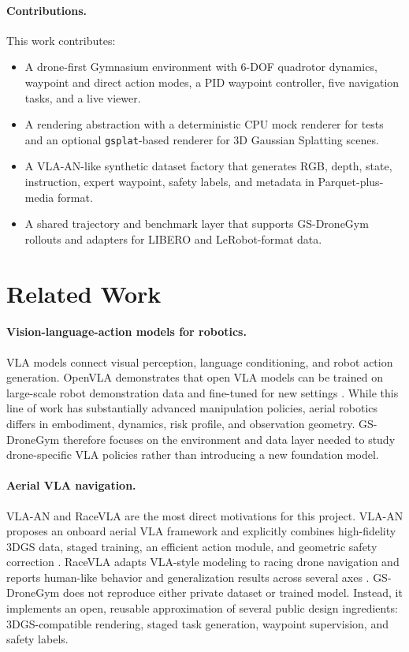 \documentclass[11pt]{article}
\begin{document}
\paragraph{Contributions.}
This work contributes:
\begin{itemize}[leftmargin=*]
    \item A drone-first Gymnasium environment with 6-DOF quadrotor dynamics, waypoint and direct action modes, a PID waypoint controller, five navigation tasks, and a live viewer.
    \item A rendering abstraction with a deterministic CPU mock renderer for tests and an optional \texttt{gsplat}-based renderer for 3D Gaussian Splatting scenes.
    \item A VLA-AN-like synthetic dataset factory that generates RGB, depth, state, instruction, expert waypoint, safety labels, and metadata in Parquet-plus-media format.
    \item A shared trajectory and benchmark layer that supports GS-DroneGym rollouts and adapters for LIBERO and LeRobot-format data.
\end{itemize}

\section{Related Work}

\paragraph{Vision-language-action models for robotics.}
VLA models connect visual perception, language conditioning, and robot action generation. OpenVLA demonstrates that open VLA models can be trained on large-scale robot demonstration data and fine-tuned for new settings \cite{kim2024openvla}. While this line of work has substantially advanced manipulation policies, aerial robotics differs in embodiment, dynamics, risk profile, and observation geometry. GS-DroneGym therefore focuses on the environment and data layer needed to study drone-specific VLA policies rather than introducing a new foundation model.

\paragraph{Aerial VLA navigation.}
VLA-AN and RaceVLA are the most direct motivations for this project. VLA-AN proposes an onboard aerial VLA framework and explicitly combines high-fidelity 3DGS data, staged training, an efficient action module, and geometric safety correction \cite{wu2025vlaan}. RaceVLA adapts VLA-style modeling to racing drone navigation and reports human-like behavior and generalization results across several axes \cite{serpiva2025racevla}. GS-DroneGym does not reproduce either private dataset or trained model. Instead, it implements an open, reusable approximation of several public design ingredients: 3DGS-compatible rendering, staged task generation, waypoint supervision, and safety labels.
\end{document}
